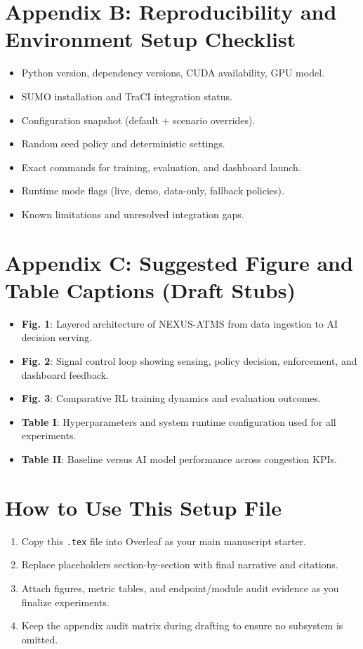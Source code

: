 \documentclass[conference]{IEEEtran}
\begin{document}
\section*{Appendix B: Reproducibility and Environment Setup Checklist}
\begin{itemize}[leftmargin=*]
	\item Python version, dependency versions, CUDA availability, GPU model.
	\item SUMO installation and TraCI integration status.
	\item Configuration snapshot (default + scenario overrides).
	\item Random seed policy and deterministic settings.
	\item Exact commands for training, evaluation, and dashboard launch.
	\item Runtime mode flags (live, demo, data-only, fallback policies).
	\item Known limitations and unresolved integration gaps.
\end{itemize}

\section*{Appendix C: Suggested Figure and Table Captions (Draft Stubs)}
\begin{itemize}[leftmargin=*]
	\item \textbf{Fig. 1}: Layered architecture of NEXUS-ATMS from data ingestion to AI decision serving.
	\item \textbf{Fig. 2}: Signal control loop showing sensing, policy decision, enforcement, and dashboard feedback.
	\item \textbf{Fig. 3}: Comparative RL training dynamics and evaluation outcomes.
	\item \textbf{Table I}: Hyperparameters and system runtime configuration used for all experiments.
	\item \textbf{Table II}: Baseline versus AI model performance across congestion KPIs.
\end{itemize}

\section*{How to Use This Setup File}
\begin{enumerate}[leftmargin=*]
	\item Copy this \texttt{.tex} file into Overleaf as your main manuscript starter.
	\item Replace placeholders section-by-section with final narrative and citations.
	\item Attach figures, metric tables, and endpoint/module audit evidence as you finalize experiments.
	\item Keep the appendix audit matrix during drafting to ensure no subsystem is omitted.
\end{enumerate}


% 
\end{document}
